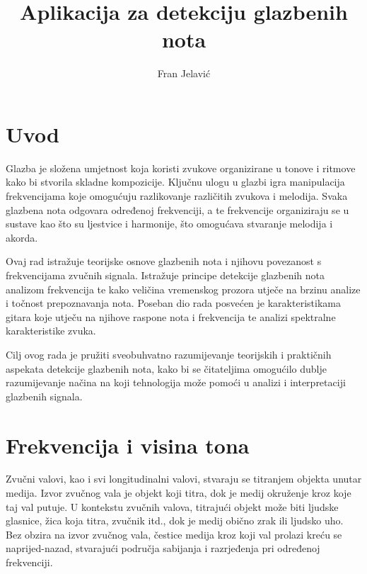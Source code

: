 \documentclass[times, utf8, diplomski, numeric]{fer}
\begin{document}

\title{Aplikacija za detekciju glazbenih nota}

\author{Fran Jelavić}

\maketitle




\tableofcontents

\chapter{Uvod}
Glazba je složena umjetnost koja koristi zvukove organizirane u tonove i ritmove kako bi stvorila skladne kompozicije. Ključnu ulogu u glazbi igra manipulacija frekvencijama koje omogućuju razlikovanje različitih zvukova i melodija. Svaka glazbena nota odgovara određenoj frekvenciji, a te frekvencije organiziraju se u sustave kao što su ljestvice i harmonije, što omogućava stvaranje melodija i akorda.

Ovaj rad istražuje teorijske osnove glazbenih nota i njihovu povezanost s frekvencijama zvučnih signala. Istražuje principe detekcije glazbenih nota analizom frekvencija te kako veličina vremenskog prozora utječe na brzinu analize i točnost prepoznavanja nota. Poseban dio rada posvećen je karakteristikama gitara koje utječu na njihove raspone nota i frekvencija te analizi spektralne karakteristike zvuka.

Cilj ovog rada je pružiti sveobuhvatno razumijevanje teorijskih i praktičnih aspekata detekcije glazbenih nota, kako bi se čitateljima omogućilo dublje razumijevanje načina na koji tehnologija može pomoći u analizi i interpretaciji glazbenih signala.
%

\chapter{Frekvencija i visina tona}
Zvučni valovi, kao i svi longitudinalni valovi, stvaraju se titranjem objekta unutar medija. Izvor zvučnog vala je objekt koji titra, dok je medij okruženje kroz koje taj val putuje. U kontekstu zvučnih valova, titrajući objekt može biti ljudske glasnice, žica koja titra, zvučnik itd., dok je medij obično zrak ili ljudsko uho. Bez obzira na izvor zvučnog vala, čestice medija kroz koji val prolazi kreću se naprijed-nazad, stvarajući područja sabijanja i razrjeđenja pri određenoj frekvenciji.
\end{document}
